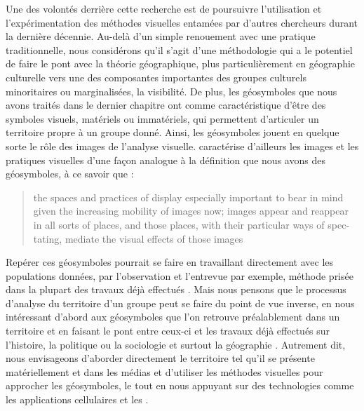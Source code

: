 Une des volontés derrière cette recherche est de poursuivre l'utilisation et l'expérimentation des méthodes visuelles entamées par d'autres chercheurs durant la dernière décennie. 
Au-delà d'un simple renouement avec une pratique traditionnelle, nous considérons qu'il s'agit d'une méthodologie qui a le potentiel de faire le pont avec la théorie géographique, plus particulièrement en géographie culturelle vers une des composantes importantes des groupes culturels minoritaires ou marginalisées, la visibilité. 
De plus, les géosymboles que nous avons traités dans le dernier chapitre ont comme caractéristique d'être des symboles visuels, matériels ou immatériels, qui permettent d'articuler un territoire propre à un groupe donné. 
Ainsi, les géosymboles jouent en quelque sorte le rôle des images de l'analyse visuelle. 
\citeauthor{Rose2012} caractérise d'ailleurs les images et les pratiques visuelles d'une façon analogue à la définition que nous avons des géosymboles, à ce savoir que : \foreignblockquote{english}[{\cite[32]{Rose2012}}][.]{\textelp{} the spaces and   practices of display  especially important to bear in mind given   the increasing mobility of images now; images appear and reappear in all sorts   of places, and those places, with their particular ways of spectating, mediate   the visual effects of those images}.
Repérer ces géosymboles pourrait se faire en travaillant directement avec les populations données, par l'observation et l'entrevue par exemple, méthode prisée dans la plupart des travaux déjà effectués \citep[][pour ne citer que ceux-ci]{Giraud2014, Podmore2015a, Higgins1999}. 
Mais nous pensons que le processus d'analyse du territoire d'un groupe peut se faire du point de vue inverse, en nous intéressant d'abord aux géosymboles que l'on retrouve préalablement dans un territoire et en faisant le pont entre ceux-ci et les travaux déjà effectués sur l'histoire, la politique ou la sociologie et surtout la géographie \lgbt. 
Autrement dit, nous envisageons d'aborder directement le territoire tel qu'il se présente matériellement et dans les médias \lgbt{} et d'utiliser les méthodes visuelles pour approcher les géosymboles, le tout en nous appuyant sur des technologies comme les applications cellulaires et les \sig.


